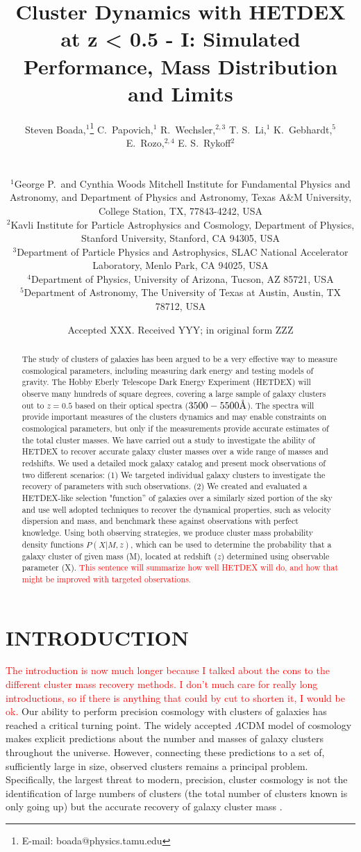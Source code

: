\documentclass[fleqn,usenatbib]{mnras}
\title[Short Title]{Cluster Dynamics with HETDEX at z < 0.5 - I: Simulated Performance, Mass Distribution and Limits}
\author[S. Boada et al.]
{\parbox{\textwidth}{Steven Boada,$^{1}$\thanks{E-mail: boada@physics.tamu.edu}
C.~Papovich,$^{1}$
R.~Wechsler,$^{2,3}$
T. S.~Li,$^{1}$
K.~Gebhardt,$^{5}$
E.~Rozo,$^{2,4}$
E. S.~Rykoff$^{2}$}\vspace{0.4cm}\
\\
\parbox{\textwidth}{$^{1}$George P.\ and Cynthia Woods Mitchell Institute for Fundamental Physics and Astronomy, and Department of Physics and Astronomy, Texas A\&M University, College Station, TX, 77843-4242, USA\\
$^{2}$Kavli Institute for Particle Astrophysics and Cosmology, Department of Physics, Stanford University, Stanford, CA 94305, USA\\
$^{3}$Department of Particle Physics and Astrophysics, SLAC National Accelerator Laboratory, Menlo Park, CA 94025, USA\\
$^{4}$Department of Physics, University of Arizona, Tucson, AZ 85721, USA\\
$^{5}$Department of Astronomy, The University of Texas at Austin, Austin, TX 78712, USA}}
\date{Accepted XXX. Received YYY; in original form ZZZ}
\newcommand{\editorial}[1]{\textcolor{red}{#1}}
\begin{document}
\label{firstpage}
\pagerange{\pageref{firstpage}--\pageref{lastpage}}
\maketitle

\begin{abstract}
\noindent
The study of clusters of galaxies has been argued to be a very effective way to measure cosmological parameters, including measuring dark energy and testing models of gravity. The Hobby Eberly Telescope Dark Energy Experiment (HETDEX) will observe many hundreds of square degrees, covering a large sample of galaxy clusters out to $z = 0.5$ based on their optical spectra ($3500-5500\hbox{\AA}$). The spectra will provide important measures of the clusters dynamics and may enable constraints on cosmological parameters, but only if the measurements provide accurate estimates of the total cluster masses. We have carried out a study to investigate the ability of HETDEX to recover accurate galaxy cluster masses over a wide range of masses and redshifts. We used a detailed mock galaxy catalog and present mock observations of two different scenarios: (1) We targeted individual galaxy clusters to investigate the recovery of parameters with such observations. (2) We created and evaluated a HETDEX-like selection "function'' of galaxies over a similarly sized portion of the sky and use well adopted techniques to recover the dynamical properties, such as velocity dispersion and mass, and benchmark these against observations with perfect knowledge. Using both observing strategies, we produce cluster mass probability density functions $P(X|M,z)$, which can be used to determine the probability that a galaxy cluster of given mass (M), located at redshift ($z$) determined using observable parameter (X). \editorial{This sentence will summarize how well HETDEX will do, and how that might be improved with targeted observations.}
\end{abstract}

\section{INTRODUCTION}
\editorial{The introduction is now much longer because I talked about the cons to the different cluster mass recovery methods. I don't much care for really long introductions, so if there is anything that could by cut to shorten it, I would be ok.}
Our ability to perform precision cosmology with clusters of galaxies has reached a critical turning point. The widely accepted $\Lambda$CDM model of cosmology makes explicit predictions about the number and masses of galaxy clusters throughout the universe. However, connecting these predictions to a set of, sufficiently large in size, observed clusters remains a principal problem. Specifically, the largest threat to modern, precision, cluster cosmology is not the identification of large numbers of clusters (the total number of clusters known is only going up) but the accurate recovery of galaxy cluster mass .
\end{document}
